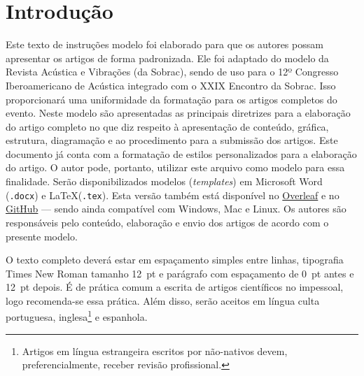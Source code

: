 \documentclass[12pt, a4paper, twoside, twocolumn]{article}
\begin{document}
 \setcounter{page}{1} 
\clearpage %

\section{Introdução}

Este texto de instruções modelo foi elaborado para que os autores possam apresentar os artigos de forma padronizada. 
Ele foi adaptado do modelo da Revista Acústica e Vibrações (da Sobrac), sendo de uso para o 12º Congresso Iberoamericano de Acústica integrado com o  XXIX Encontro da Sobrac.
%
Isso proporcionará uma uniformidade da formatação para os artigos completos do evento.
Neste modelo são apresentadas as principais diretrizes para a elaboração do artigo completo no que diz respeito à apresentação de conteúdo, gráfica, estrutura, diagramação e ao procedimento para a submissão dos artigos. 
Este documento já conta com a formatação de estilos personalizados para a elaboração do artigo. O autor pode, portanto, utilizar este arquivo como modelo para essa finalidade. Serão disponibilizados modelos (\textit{templates}) em Microsoft Word (\texttt{.docx}) e \LaTeX\xspace (\texttt{.tex}). Esta versão também está disponível no \href{https://www.overleaf.com/read/rnfjxkknksnd}{Overleaf} e no \href{https://github.com/willdfonseca/latex}{GitHub} --- sendo ainda compatível com Windows, Mac e Linux. 
Os autores são responsáveis pelo conteúdo, elaboração e envio dos artigos de acordo com o presente modelo.


O texto completo deverá estar em espaçamento simples entre linhas, tipografia Times New Roman tamanho 12~pt e parágrafo com espaçamento de 0~pt antes e 12~pt depois. É de prática comum a escrita de artigos científicos no impessoal, logo recomenda-se essa prática. Além disso, serão aceitos em língua culta portuguesa, inglesa\footnote{Artigos em língua estrangeira escritos por não-nativos devem, preferencialmente, receber revisão profissional.} e espanhola. 
\end{document}
